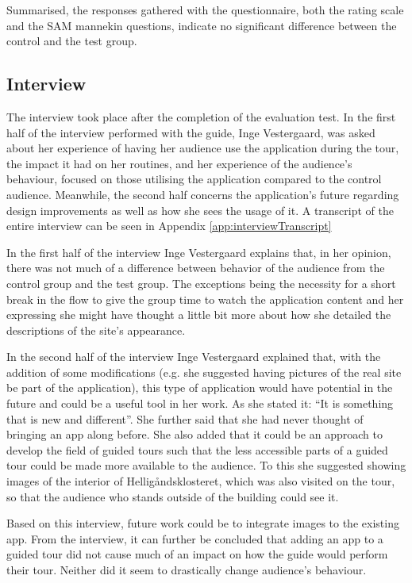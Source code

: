 Summarised, the responses gathered with the questionnaire, both the rating scale and the SAM mannekin questions, indicate no significant difference between the control and the test group.

\subsection{Interview}
The interview took place after the completion of the evaluation test. In the first half of the interview performed with the guide, Inge Vestergaard, was asked about her experience of having her audience use the application during the tour, the impact it had on her routines, and her experience of the audience’s behaviour, focused on those utilising the application compared to the control audience. Meanwhile, the second half concerns the application’s future regarding design improvements as well as how she sees the usage of it. A transcript of the entire interview can be seen in Appendix \ref{app:interviewTranscript}

In the first half of the interview Inge Vestergaard explains that, in her opinion, there was not much of a difference between behavior of the audience from the control group and the test group. The exceptions being the necessity for a short break in the flow to give the group time to watch the application content and her expressing she might have thought a little bit more about how she detailed the descriptions of the site’s appearance.     

In the second half of the interview Inge Vestergaard explained that, with the addition of some modifications (e.g. she suggested having pictures of the real site be part of the application), this type of application would have potential in the future and could be a useful tool in her work. As she stated it: “It is something that is new and different”. She further said that she had never thought of bringing an app along before. She also added that it could be an approach to develop the field of guided tours such that the less accessible parts of a guided tour could be made more available to the audience. To this she suggested showing images of the interior of Helligåndsklosteret, which was also visited on the tour, so that the audience who stands outside of the building could see it.

Based on this interview, future work could be to integrate images to the existing app. From the interview, it can further be concluded that adding an app to a guided tour did not cause much of an impact on how the guide would perform their tour. Neither did it seem to drastically change audience’s behaviour. 

